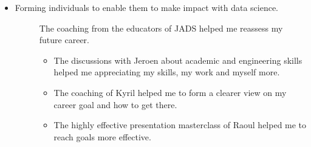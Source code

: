 \documentclass[letterpaper,10pt,english]{sphinxmanual}
\begin{document}
\begin{itemize}
\begin{description}
\end{description}

\item {} \begin{description}
\item[{Forming individuals to enable them to make impact with data science.}] \leavevmode
The coaching from the educators of JADS helped me reassess my future career.
\begin{itemize}
\item {} 
The discussions with Jeroen about academic and engineering skills helped me appreciating my skills, my work and myself more.

\item {} 
The coaching of Kyril helped me to form a clearer view on my career goal and how to get there.

\item {} 
The highly effective presentation masterclass of Raoul helped me to reach goals more effective.

\end{itemize}

\end{description}

\end{itemize}
\end{document}
